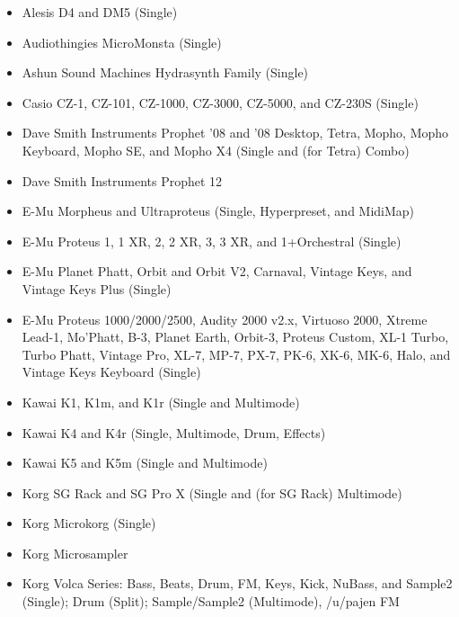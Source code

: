 \documentclass{article}
\begin{document}
{
\small
\begin{multicols}{2}
\begin{flushleft}
\begin{itemize}
\item Alesis D4 and DM5 (Single)
\item Audiothingies MicroMonsta (Single)
\item Ashun Sound Machines Hydrasynth Family (Single)
\item Casio CZ-1, CZ-101, CZ-1000, CZ-3000, CZ-5000, and CZ-230S (Single)
\item Dave Smith Instruments Prophet '08 and '08 Desktop, Tetra, Mopho, Mopho Keyboard, Mopho SE, and Mopho X4 (Single and (for Tetra) Combo)
\item Dave Smith Instruments Prophet 12
\item E-Mu Morpheus and Ultraproteus (Single, Hyperpreset, and MidiMap)
\item E-Mu Proteus 1, 1 XR, 2, 2 XR, 3, 3 XR, and 1+Orchestral (Single)
\item E-Mu Planet Phatt, Orbit and Orbit V2, Carnaval, Vintage Keys, and Vintage Keys Plus (Single)
\item E-Mu Proteus 1000/2000/2500, Audity 2000 v2.x, Virtuoso 2000, Xtreme Lead-1, Mo'Phatt, B-3, Planet Earth, Orbit-3, Proteus Custom, XL-1 Turbo, Turbo Phatt, Vintage Pro, XL-7, MP-7, PX-7, PK-6, XK-6, MK-6, Halo, and Vintage Keys Keyboard (Single)
\item Kawai K1, K1m, and K1r (Single and Multimode)
\item Kawai K4 and K4r (Single, Multimode, Drum, Effects)
\item Kawai K5 and K5m (Single and Multimode)
\item Korg SG Rack and SG Pro X (Single and (for SG Rack) Multimode)
\item Korg Microkorg (Single)
\item Korg Microsampler
\item Korg Volca Series: Bass, Beats, Drum, FM, Keys, Kick, NuBass, and Sample2 (Single); Drum (Split); Sample/Sample2 (Multimode), /u/pajen FM


\end{itemize}
\end{flushleft}
\end{multicols}}
\end{document}
